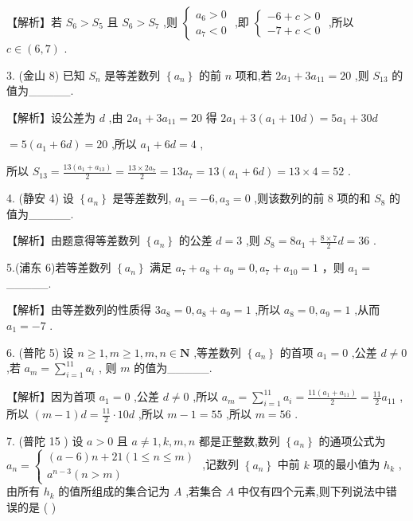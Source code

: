 \documentclass[10pt]{article}
\begin{document}
【解析】若 \({S}_{6} > {S}_{5}\) 且 \({S}_{6} > {S}_{7}\) ,则 \(\left\{  \begin{array}{l} {a}_{6} > 0 \\  {a}_{7} < 0 \end{array}\right.\) ,即 \(\left\{  \begin{array}{l}  - 6 + c > 0 \\   - 7 + c < 0 \end{array}\right.\) ,所以 \(c \in  \left( {6,7}\right)\) .

3. (金山 8) 已知 \({S}_{n}\) 是等差数列 \(\left\{  {a}_{n}\right\}\) 的前 \(n\) 项和,若 \(2{a}_{1} + 3{a}_{11} = {20}\) ,则 \({S}_{13}\) 的值为\_\_\_\_\_.

【解析】设公差为 \(d\) ,由 \(2{a}_{1} + 3{a}_{11} = {20}\) 得 \(2{a}_{1} + 3\left( {{a}_{1} + {10d}}\right)  = 5{a}_{1} + {30d}\)

\(= 5\left( {{a}_{1} + {6d}}\right)  = {20}\) ,所以 \({a}_{1} + {6d} = 4\) ,

所以 \({S}_{13} = \frac{{13}\left( {{a}_{1} + {a}_{13}}\right) }{2} = \frac{{13} \times  2{a}_{7}}{2} = {13}{a}_{7} = {13}\left( {{a}_{1} + {6d}}\right)  = {13} \times  4 = {52}\) .

4. (静安 4) 设 \(\left\{  {a}_{n}\right\}\) 是等差数列, \({a}_{1} =  - 6,{a}_{3} = 0\) ,则该数列的前 8 项的和 \({S}_{8}\) 的值为\_\_\_\_\_.

【解析】由题意得等差数列 \(\left\{  {a}_{n}\right\}\) 的公差 \(d = 3\) ,则 \({S}_{8} = 8{a}_{1} + \frac{8 \times  7}{2}d = {36}\) .

5.(浦东 6)若等差数列 \(\left\{  {a}_{n}\right\}\) 满足 \({a}_{7} + {a}_{8} + {a}_{9} = 0,{a}_{7} + {a}_{10} = 1\) ，则 \({a}_{1} =\) \_\_\_\_\_.

【解析】由等差数列的性质得 \(3{a}_{8} = 0,{a}_{8} + {a}_{9} = 1\) ,所以 \({a}_{8} = 0,{a}_{9} = 1\) ,从而 \({a}_{1} =  - 7\) .

6. (普陀 5) 设 \(n \geq  1,m \geq  1,m,n \in  \mathbf{N}\) ,等差数列 \(\left\{  {a}_{n}\right\}\) 的首项 \({a}_{1} = 0\) ,公差 \(d \neq  0\) ,若 \({a}_{m} = \mathop{\sum }\limits_{{i = 1}}^{{11}}{a}_{i}\) , 则 \(m\) 的值为\_\_\_\_\_.

【解析】因为首项 \({a}_{1} = 0\) ,公差 \(d \neq  0\) ,所以 \({a}_{m} = \mathop{\sum }\limits_{{i = 1}}^{{11}}{a}_{i} = \frac{{11}\left( {{a}_{1} + {a}_{11}}\right) }{2} = \frac{11}{2}{a}_{11}\) , 所以 \(\left( {m - 1}\right) d = \frac{11}{2} \cdot  {10d}\) ,所以 \(m - 1 = {55}\) ,所以 \(m = {56}\) .

7. (普陀 15 ) 设 \(a > 0\) 且 \(a \neq  1,k,m,n\) 都是正整数,数列 \(\left\{  {a}_{n}\right\}\) 的通项公式为 \({a}_{n} = \left\{  \begin{matrix} \left( {a - 6}\right) n + {21}\left( {1 \leq  n \leq  m}\right) \\  {a}^{n - 3}\left( {n > m}\right)  \end{matrix}\right.\) ,记数列 \(\left\{  {a}_{n}\right\}\) 中前 \(k\) 项的最小值为 \({h}_{k}\) ,由所有 \({h}_{k}\) 的值所组成的集合记为 \(A\) ,若集合 \(A\) 中仅有四个元素,则下列说法中错误的是 ( )
\end{document}
